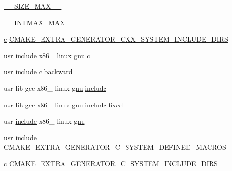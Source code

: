 \begin{DoxyCompactItemize}
\item 
\hyperlink{cmake-build-release_2CMakeCache_8txt_ad4abf877d7a79e3d1d13494ce6d64d73}{\+\_\+\+\_\+\+S\+I\+Z\+E\+\_\+\+M\+A\+X\+\_\+\+\_\+}
\item 
\hyperlink{cmake-build-release_2CMakeCache_8txt_a6b068320140ebfbbeaa001c18465ea9e}{\+\_\+\+\_\+\+I\+N\+T\+M\+A\+X\+\_\+\+M\+A\+X\+\_\+\+\_\+}
\item 
\hyperlink{cmake-build-release_2CMakeCache_8txt_aac1d6a1710812201527c735f7c6afbaa}{c} \hyperlink{cmake-build-release_2CMakeCache_8txt_ae84758144b16fbed96a3e6ea5781d3ad}{C\+M\+A\+K\+E\+\_\+\+E\+X\+T\+R\+A\+\_\+\+G\+E\+N\+E\+R\+A\+T\+O\+R\+\_\+\+C\+X\+X\+\_\+\+S\+Y\+S\+T\+E\+M\+\_\+\+I\+N\+C\+L\+U\+D\+E\+\_\+\+D\+I\+RS}
\item 
usr \hyperlink{cmake-build-release_2CMakeCache_8txt_a986ccfc90e04633694fe6cff5472be19}{include} x86\+\_ linux \hyperlink{cmake-build-release_2CMakeCache_8txt_acb61b5fec09bcc7d3b88bf1109612ea6}{gnu} \hyperlink{cmake-build-release_2CMakeCache_8txt_aac1d6a1710812201527c735f7c6afbaa}{c}
\item 
usr \hyperlink{cmake-build-release_2CMakeCache_8txt_a986ccfc90e04633694fe6cff5472be19}{include} \hyperlink{cmake-build-release_2CMakeCache_8txt_aac1d6a1710812201527c735f7c6afbaa}{c} \hyperlink{cmake-build-release_2CMakeCache_8txt_a4e00b9c657cdeb7b14ea0c43097dcecc}{backward}
\item 
usr lib gcc x86\+\_ linux \hyperlink{cmake-build-release_2CMakeCache_8txt_acb61b5fec09bcc7d3b88bf1109612ea6}{gnu} \hyperlink{cmake-build-release_2CMakeCache_8txt_a986ccfc90e04633694fe6cff5472be19}{include}
\item 
usr lib gcc x86\+\_ linux \hyperlink{cmake-build-release_2CMakeCache_8txt_acb61b5fec09bcc7d3b88bf1109612ea6}{gnu} \hyperlink{cmake-build-release_2CMakeCache_8txt_a986ccfc90e04633694fe6cff5472be19}{include} \hyperlink{cmake-build-release_2CMakeCache_8txt_a4a461500e9bc62f37d07d326b178ef08}{fixed}
\item 
usr \hyperlink{cmake-build-release_2CMakeCache_8txt_a986ccfc90e04633694fe6cff5472be19}{include} x86\+\_ linux \hyperlink{cmake-build-release_2CMakeCache_8txt_acb61b5fec09bcc7d3b88bf1109612ea6}{gnu}
\item 
usr \hyperlink{cmake-build-release_2CMakeCache_8txt_a986ccfc90e04633694fe6cff5472be19}{include} \hyperlink{cmake-build-release_2CMakeCache_8txt_ab210976cb9b88cff4b84f82940881802}{C\+M\+A\+K\+E\+\_\+\+E\+X\+T\+R\+A\+\_\+\+G\+E\+N\+E\+R\+A\+T\+O\+R\+\_\+\+C\+\_\+\+S\+Y\+S\+T\+E\+M\+\_\+\+D\+E\+F\+I\+N\+E\+D\+\_\+\+M\+A\+C\+R\+OS}
\item 
\hyperlink{cmake-build-release_2CMakeCache_8txt_aac1d6a1710812201527c735f7c6afbaa}{c} \hyperlink{cmake-build-release_2CMakeCache_8txt_ad56d00d3d7b282aa4096d39b0f15746c}{C\+M\+A\+K\+E\+\_\+\+E\+X\+T\+R\+A\+\_\+\+G\+E\+N\+E\+R\+A\+T\+O\+R\+\_\+\+C\+\_\+\+S\+Y\+S\+T\+E\+M\+\_\+\+I\+N\+C\+L\+U\+D\+E\+\_\+\+D\+I\+RS}
\end{DoxyCompactItemize}


